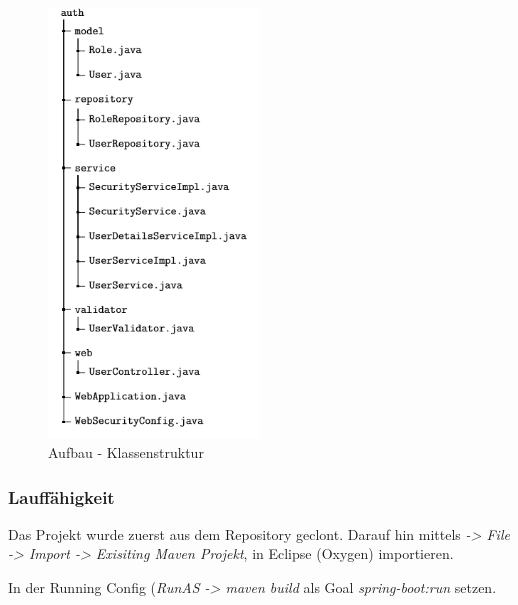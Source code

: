        \newpage
        
            \begin{figure}[h]
        	    \centering
        		\includegraphics[width=0.5\textwidth]{images/Unbenannt2.PNG}
        	    \caption{Aufbau - Klassenstruktur}
            \end{figure}
            
        \clearpage
        \subsubsection{Lauffähigkeit}
             Das Projekt wurde zuerst aus dem Repository geclont. Darauf hin mittels \textit{-> File -> Import -> Exisiting Maven Projekt}, in Eclipse (Oxygen) importieren.
        
            In der Running Config (\textit{RunAS -> maven build} als Goal \textit{spring-boot:run} setzen.
            
